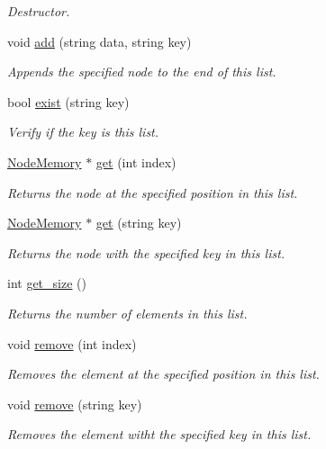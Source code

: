 \begin{DoxyCompactItemize}
\begin{DoxyCompactList}\small\item\em Destructor. \end{DoxyCompactList}\item 
void \hyperlink{classMemory_a1c5845ec12edc89a46ae9a429751dad4}{add} (string data, string key)
\begin{DoxyCompactList}\small\item\em Appends the specified node to the end of this list. \end{DoxyCompactList}\item 
bool \hyperlink{classMemory_ab7f1b528e6d338a6e8a34213e84428f8}{exist} (string key)
\begin{DoxyCompactList}\small\item\em Verify if the key is this list. \end{DoxyCompactList}\item 
\hyperlink{classNodeMemory}{Node\+Memory} $\ast$ \hyperlink{classMemory_abad3ec0c9cd654bed7dbbc94f84d7109}{get} (int index)
\begin{DoxyCompactList}\small\item\em Returns the node at the specified position in this list. \end{DoxyCompactList}\item 
\hyperlink{classNodeMemory}{Node\+Memory} $\ast$ \hyperlink{classMemory_a4e46131b5a3dbf96258d7c5ebe665f32}{get} (string key)
\begin{DoxyCompactList}\small\item\em Returns the node with the specified key in this list. \end{DoxyCompactList}\item 
int \hyperlink{classMemory_a1c3e9773bfe8ca3f70cfdfd1400b5851}{get\+\_\+size} ()
\begin{DoxyCompactList}\small\item\em Returns the number of elements in this list. \end{DoxyCompactList}\item 
void \hyperlink{classMemory_a75a4c6877d75391b28778671cbd523b4}{remove} (int index)
\begin{DoxyCompactList}\small\item\em Removes the element at the specified position in this list. \end{DoxyCompactList}\item 
void \hyperlink{classMemory_a3a048dda4d162dcd396bcc2e1f454bfb}{remove} (string key)
\begin{DoxyCompactList}\small\item\em Removes the element witht the specified key in this list. \end{DoxyCompactList}\item 

\end{DoxyCompactItemize}
